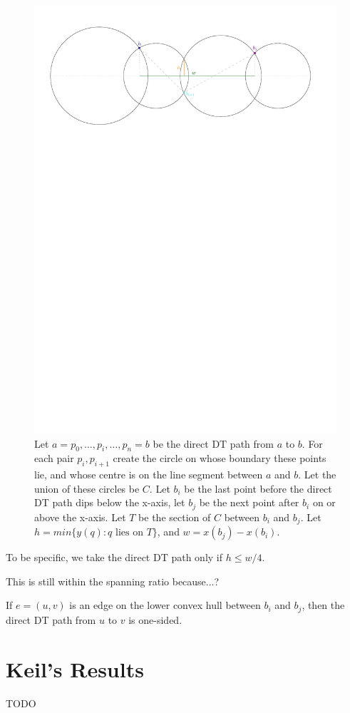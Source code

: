 \documentclass{tufte-handout}
\begin{document}
\begin{figure}
  \includegraphics[scale=0.6]{figures/height_width.pdf}
  \caption{Let $a = p_0, \ldots, p_i, \ldots, p_n = b$ be the direct
    DT path from $a$ to $b$.  For each pair $p_i, p_{i+1}$ create the
    circle on whose boundary these points lie, and whose centre is on
    the line segment between $a$ and $b$.  Let the union of these
    circles be $C$.  Let $b_i$ be the last point before the direct DT
    path dips below the x-axis, let $b_j$ be the next point after
    $b_i$ on or above the x-axis.  Let $T$ be the section of $C$
    between $b_i$ and $b_j$.  Let $h = min \{ y(q): q \text{ lies on }
    T \}$, and $w = x(b_j) - x(b_i)$.}
\end{figure}

To be specific, we take the direct DT path only if $h \le w/4$.

This is still within the spanning ratio because...?

\begin{Lemma}

  If $e = (u,v)$ is an edge on the lower convex hull between $b_i$ and
  $b_j$, then the direct DT path from $u$ to $v$ is one-sided.
  
\end{Lemma}

\newpage
\part{Keil's Results}

TODO


\newpage

\end{document}
